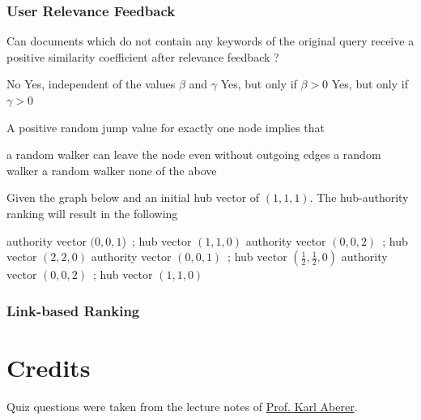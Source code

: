 \documentclass[12pt,a4paper]{exam} %
\begin{document}
\subsubsection{User Relevance Feedback}
\begin{questions}
\question Can documents which do not contain any keywords of the original query receive a positive similarity coefficient after relevance feedback ?
\begin{checkboxes}
\choice No
\choice Yes, independent of the values $\beta$ and $\gamma$
\CorrectChoice Yes, but only if $\beta>0$
\choice Yes, but only if $\gamma>0$
\end{checkboxes}

\question A positive random jump value for exactly one node implies that
\begin{checkboxes}
\CorrectChoice a random walker can leave the node even without outgoing edges
\choice a random walker
\CorrectChoice a random walker
\choice none of the above
\end{checkboxes}

\question Given the graph below and an initial hub vector of $(1,1,1)$. The hub-authority ranking will result in the following
\begin{checkboxes}
\choice authority vector $(0,0,1$)~; hub vector $(1,1,0)$
\choice authority vector $(0,0,2)$~; hub vector $(2,2,0)$
\CorrectChoice authority vector $(0,0,1)$~; hub vector $(\frac{1}{2},\frac{1}{2},0)$
\choice authority vector $(0,0,2)$~; hub vector $(1,1,0)$
\end{checkboxes}
\end{questions}

\subsubsection{Link-based Ranking}
\begin{questions}
\question
\begin{checkboxes}
\end{checkboxes}

%
\question
\begin{checkboxes}
\end{checkboxes}
\end{questions}

\section*{Credits}
Quiz questions were taken from the lecture notes of \href{http://people.epfl.ch/karl.aberer}{Prof. Karl Aberer}.\\
\end{document}
